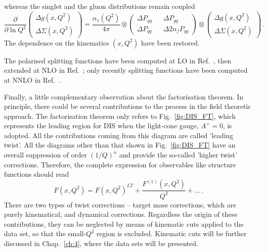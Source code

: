 whereas the singlet and the gluon distributions remain coupled 
\begin{equation}
  \frac{\partial}{\partial \ln Q^2} 
  \left(\begin{matrix}
    \Delta g (x,Q^2)\\
    \Delta \Sigma (x,Q^2)
  \end{matrix} \right) 
  = \frac{\alpha_{s}(Q^2)}{4 \pi} \otimes
  \left(\begin{matrix}
    \Delta P_{gg} && \Delta P_{gq} \\
    \Delta P_{qq} && \Delta 2n_f P_{qg}
  \end{matrix} \right)
  \otimes 
  \left(\begin{matrix}
    \Delta g (x,Q^2) \\
    \Delta \Sigma (x,Q^2)
  \end{matrix} \right) \,.
\end{equation}
The dependence on the kinematics $(x,Q^2)$ have been restored.%

The polarised splitting functions have been computed at LO in Ref.~\cite{Altarelli:1977zs}, then extended at NLO in Ref.~\cite{Mertig:1995ny, Vogelsang:1995vh}; only recently splitting functions have been computed at NNLO in Ref.~\cite{Moch:2014sna}.%

Finally, a little complementary observation about the factorisation theorem. In principle, there could be several contributions to the process in the field theoretic approach. The factorisation theorem only refers to Fig.~\ref{fig:DIS_FT}, which represents the leading region for DIS when the light-cone gauge, $A^{+}=0$, is adopted. All the contributions coming from this diagram are called 'leading twist'. All the diagrams other than that shown in Fig.~\ref{fig:DIS_FT} have an overall suppression of order $(1/Q)^{n}$ and provide the so-called 'higher twist' corrections. Therefore, the complete expression for observables like structure functions should read
\begin{equation}
  F(x, Q^2) = F(x, Q^2)^{LT} + \frac{F^{(1)}(x,Q^2)}{Q^2} + \dots \,.
\end{equation}
There are two types of twist corrections -- target mass corrections, which are purely kinematical, and dynamical corrections. Regardless the origin of these contributions, they can be neglected by means of kinematic cuts applied to the data set, so that the small-$Q^2$ region is excluded. Kinematic cuts will be further discussed in Chap.~\ref{ch:4}, where the data sets will be presented.

